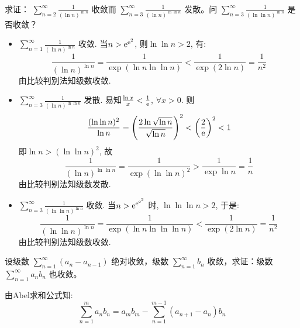 \begin{problem}
    求证： \(\sum_{n=2}^{\infty} \frac{1}{(\ln n)^{\ln n}}\) 收敛而
    \(\sum_{n=3}^{\infty} \frac{1}{(\ln n)^{\ln \ln n}}\) 发散。问
    \(\sum_{n=3}^{\infty} \frac{1}{(\ln \ln n)^{\ln n}}\) 是否收敛？
\end{problem}

\begin{solution}
    \begin{itemize}
        \item \(\sum_{n=1}^{\infty} \frac{1}{(\ln n)^{\ln n}}\) 收敛.
            当\(n > \mathrm{e}^{\mathrm{e}^{2}}\), 则\(\ln \ln n > 2\), 有:
            \[
                \frac{1}{(\ln n)^{\ln n}} = \frac{1}{\exp(\ln n
                \ln\ln n)} < \frac{1}{\exp(2\ln n)} = \frac{1}{n^2}
            \]
            由比较判别法知级数收敛.
        \item \(\sum_{n=3}^{\infty} \frac{1}{(\ln n)^{\ln
            \ln n}}\) 发散.
            易知\(\frac{\ln x}{x} < \frac{1}{\mathrm{e}}\), \(\forall x > 0\).
            则\[
                \frac{(\ln\ln n)^{2}}{\ln n} = \left( \frac{2\ln
                \sqrt{\ln n}}{\sqrt{\ln n}} \right)^{2} < \left(
                \frac{2}{\mathrm{e}} \right)^{2} < 1
            \]
            即\(\ln n > (\ln \ln n)^{2}\), 故\[
                \frac{1}{(\ln n)^{\ln \ln n}} = \frac{1}{\exp(\ln\ln
                n)^{2}} > \frac{1}{\exp \ln n} = \frac{1}{n}
            \]
            由比较判别法知级数发散.
        \item \(\sum_{n=3}^{\infty} \frac{1}{(\ln \ln
            n)^{\ln n}}\) 收敛.
            当\(n > \mathrm{e}^{\mathrm{e}^{\mathrm{e}^{2}}}\) 时,
            \(\ln\ln\ln n > 2\), 于是: \[
                \frac{1}{(\ln \ln n)^{\ln n}} = \frac{1}{\exp(\ln n
                \ln\ln\ln n)} < \frac{1}{\exp(2\ln n)} = \frac{1}{n^2}
            \]
            由比较判别法知级数收敛.
    \end{itemize}
\end{solution}
\setcounter{problems}{11}
\begin{problem}
    设级数 \(\sum_{n=1}^{\infty} (a_n - a_{n-1})\) 绝对收敛，级数
    \(\sum_{n=1}^{\infty} b_n\) 收敛，求证：级数
    \(\sum_{n=1}^{\infty} a_n b_n\) 也收敛。
\end{problem}

\begin{solution}
    由Abel求和公式知: \[
        \sum_{n=1}^{m} a_{n}b_{n} = a_{m}b_{m} - \sum_{n=1}^{m-1}
        (a_{n+1} - a_{n})b_{n}
    \]

\end{solution}
